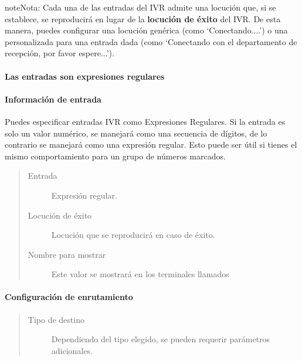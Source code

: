 \documentclass[letterpaper,10pt,spanish]{sphinxmanual}
\begin{document}
\begin{notice}{note}{Nota:}
Cada una de las entradas del IVR admite una locución que, si se establece, se reproducirá en lugar de la \textbf{locución de éxito} del IVR. De esta manera, puedes configurar una locución genérica (como `Conectando....') o una personalizada para una entrada dada (como `Conectando con el departamento de recepción, por favor espere...').
\end{notice}
\paragraph{Las entradas son expresiones regulares}


\paragraph{Información de entrada}
\label{administration_portal/client/vpbx/routing_endpoints/ivrs:entry-information}
Puedes especificar entradas IVR como Expresiones Regulares. Si la entrada es solo un valor numérico, se manejará como una secuencia de dígitos, de lo contrario se manejará como una expresión regular. Esto puede ser útil si tienes el mismo comportamiento para un grupo de números marcados.
\begin{quote}
\begin{description}
\item[{Entrada}] \leavevmode
Expresión regular.

\item[{Locución de éxito}] \leavevmode
Locución que se reproducirá en caso de éxito.

\item[{Nombre para mostrar}] \leavevmode
Este valor se mostrará en los terminales llamados

\end{description}
\end{quote}


\paragraph{Configuración de enrutamiento}
\label{administration_portal/client/vpbx/routing_endpoints/ivrs:routing-configuration}\begin{quote}
\begin{description}
\item[{Tipo de destino}] \leavevmode
Dependiendo del tipo elegido, se pueden requerir parámetros adicionales.

\end{description}
\end{quote}
\end{document}
